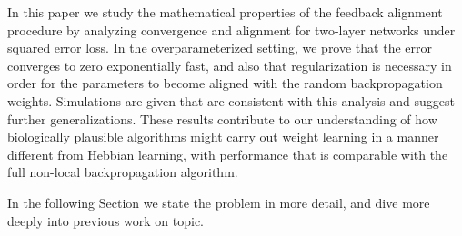 In this paper we study the mathematical properties of the feedback alignment procedure by analyzing convergence and alignment for two-layer networks under squared error loss. In the overparameterized setting, we prove that the error converges to zero exponentially fast, and also that regularization is necessary in order for the  parameters to become aligned with the random backpropagation weights. Simulations are given that are consistent with this analysis and suggest further generalizations. These results contribute to our understanding of how biologically plausible algorithms might carry out weight learning in a manner different from Hebbian learning, with performance that is comparable with the full non-local backpropagation algorithm.




In the following Section we state the problem in more detail, and dive more deeply into previous   work on topic.
